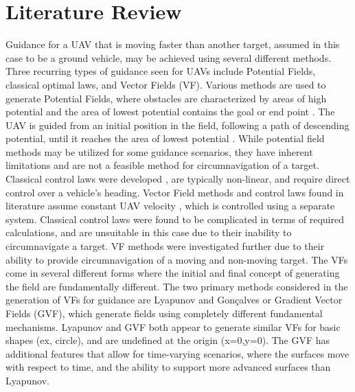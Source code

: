 \documentclass[conf]{new-aiaa}
\begin{document}
\section{Literature Review}
Guidance for a UAV that is moving faster than another target, assumed in this case to be a ground vehicle, may be achieved using several different methods. Three recurring types of guidance seen for UAVs include Potential Fields, classical optimal laws, and Vector Fields (VF). Various methods are used to generate Potential Fields, where obstacles are characterized by areas of high potential and the area of lowest potential contains the goal or end point {\cite{goerzen2010survey}}. The UAV is guided from an initial position in the field, following a path of descending potential, until it reaches the area of lowest potential {\cite{goerzen2010survey}}. While potential field methods may be utilized for some guidance scenarios, they have inherent limitations {\cite{koren1991potential}} and are not a feasible method for circumnavigation of a target. Classical control laws were developed {\cite{oliveira2016moving,kaminer1998trajectory}}, are typically non-linear, and require direct control over a vehicle's heading. Vector Field methods and control laws found in literature assume constant UAV velocity {\cite{chen2009tracking}}, which is controlled using a separate system. Classical control laws were found to be complicated in terms of required calculations, and are unsuitable in this case due to their inability to circumnavigate a target. VF methods were investigated further due to their ability to provide circumnavigation of a moving and non-moving target. The VFs come in several different forms where the initial and final concept of generating the field are fundamentally different. The two primary methods considered in the generation of VFs for guidance are Lyapunov {\cite{frew_tracking_2012}} and Gon\c{c}alves {\cite{goncalves_circulation_2010}} or Gradient Vector Fields (GVF), which generate fields using completely different fundamental mechanisms. Lyapunov and GVF both appear to generate similar VFs for basic shapes (ex, circle), and are undefined at the origin (x=0,y=0). The GVF has additional features that allow for time-varying scenarios, where the surfaces move with respect to time, and the ability to support more advanced surfaces than Lyapunov.
\end{document}
